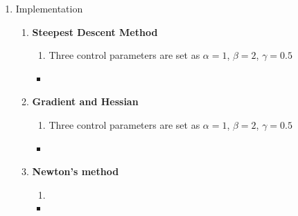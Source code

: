 \documentclass[../main.tex]{subfiles}
\begin{document}
\begin{enumerate}
    \item Implementation
      \begin{enumerate}
        \item \textbf{Steepest Descent Method}
        \begin{enumerate}
          \item Three control parameters are set as $\alpha=1$, $\beta=2$, $\gamma=0.5$
        \end{enumerate}
    
        \begin{itemize}[label=\quad,leftmargin=-5em]
          \item {}
        \end{itemize}
    
        \newpage %
        \item \textbf{Gradient and Hessian}
        \begin{enumerate}
            \item Three control parameters are set as $\alpha=1$, $\beta=2$, $\gamma=0.5$
          \end{enumerate}
      
          \begin{itemize}[label=\quad,leftmargin=-5em]
            \item {}
          \end{itemize}

        \newpage %
        \item \textbf{Newton's method}
        \begin{enumerate}
          \item
        \end{enumerate}
        \begin{itemize}[label=\quad,leftmargin=-5em]
          \item {}
        \end{itemize}
    

\end{enumerate}
\end{enumerate}
\end{document}
